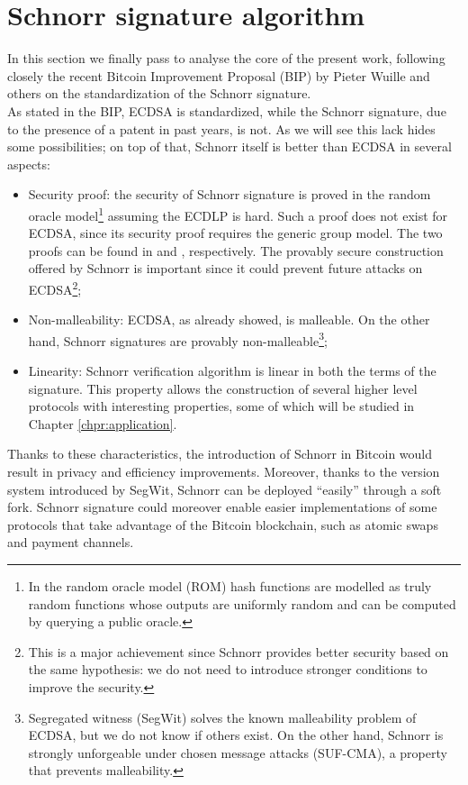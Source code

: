 \bigskip

\bigskip

\section{Schnorr signature algorithm}
\label{schnorr}
In this section we finally pass to analyse the core of the present work, following closely the recent Bitcoin Improvement Proposal (BIP) by Pieter Wuille and others \cite{RefWork:5} on the standardization of the Schnorr signature.
\\
As stated in the BIP, ECDSA is standardized, while the Schnorr signature, due to the presence of a patent in past years, is not. As we will see this lack hides some possibilities; on top of that, Schnorr itself is better than ECDSA in several aspects:
\begin{itemize}
	\item Security proof: the security of Schnorr signature is proved in the random oracle model\footnote{In the random oracle model (ROM) hash functions are modelled as truly random functions whose outputs are uniformly random and can be computed by querying a public oracle.} assuming the ECDLP is hard. Such a proof does not exist for ECDSA, since its security proof requires the generic group model. The two proofs can be found in \cite{RefWork:8} and \cite{RefWork:9}, respectively. The provably secure construction offered by Schnorr is important since it could prevent future attacks on ECDSA\footnote{This is a major achievement since Schnorr provides better security based on the same hypothesis: we do not need to introduce stronger conditions to improve the security.};
	\item Non-malleability: ECDSA, as already showed, is malleable. On the other hand, Schnorr signatures are provably non-malleable\footnote{Segregated witness (SegWit) solves the known malleability problem of ECDSA, but we do not know if others exist. On the other hand, Schnorr is strongly unforgeable under chosen message attacks (SUF-CMA), a property that prevents malleability.};
	\item Linearity: Schnorr verification algorithm is linear in both the terms of the signature. This property allows the construction of several higher level protocols with interesting properties, some of which will be studied in Chapter \ref{chpr:application}.
\end{itemize}
Thanks to these characteristics, the introduction of Schnorr in Bitcoin would result in privacy and efficiency improvements. Moreover, thanks to the version system introduced by SegWit, Schnorr can be deployed ``easily'' through a soft fork. Schnorr signature could moreover enable easier implementations of some protocols that take advantage of the Bitcoin blockchain, such as atomic swaps and payment channels.

